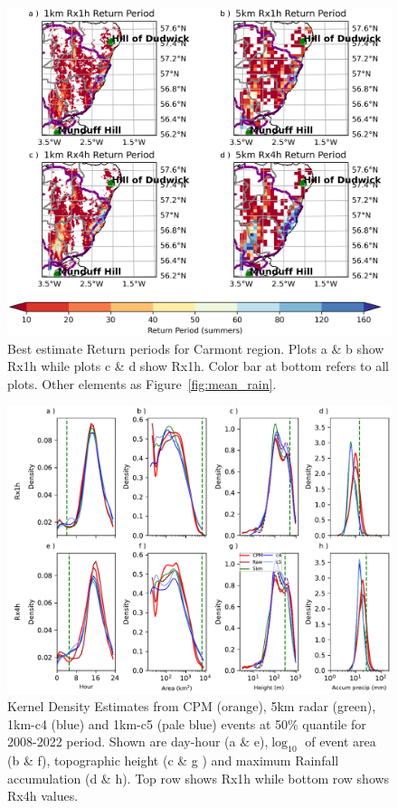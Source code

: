 \documentclass[11pt,a4paper]{article}
\begin{document}
\begin{figure}
	\centering
	\includegraphics[width=\linewidth]{map_return_prds}
	\caption{Best estimate Return periods for Carmont region. Plots a \& b show Rx1h while plots c \& d show Rx1h. Color bar at bottom refers to all plots. Other elements as Figure~\ref{fig:mean_rain}. } 
	\label{fig:map_rtn_prd}
\end{figure}


\begin{figure}
	\centering
	\includegraphics[width=\linewidth]{kde_smooth_events}
	\caption{Kernel Density Estimates from  CPM (orange), 5km radar (green), 1km-c4 (blue) and 1km-c5 (pale blue) events at 50\% quantile for 2008-2022 period. Shown are day-hour (a \& e),$\log_{10}$ of event area (b \& f),  topographic height (c \& g ) and maximum Rainfall accumulation (d \& h). Top row shows Rx1h while bottom row shows Rx4h values.}
\end{figure}
\end{document}
